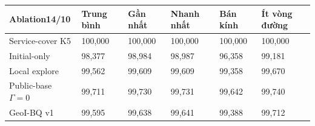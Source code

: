\par\smallskip\noindent\begin{tabularx}{\linewidth}{@{}P{4cm}XXXXX@{}}\toprule
\textbf{Ablation14/10} & \textbf{Trung bình} & \textbf{Gần nhất} & \textbf{Nhanh nhất} & \textbf{Bán kính} & \textbf{Ít vòng đường} \\
\midrule
Service-cover K5 & 100{,}000 & 100{,}000 & 100{,}000 & 100{,}000 & 100{,}000 \\
Initial-only & 98{,}377 & 98{,}984 & 98{,}987 & 96{,}358 & 99{,}181 \\
Local explore & 99{,}562 & 99{,}609 & 99{,}609 & 99{,}358 & 99{,}670 \\
Public-base $\Gamma=0$ & 99{,}711 & 99{,}730 & 99{,}731 & 99{,}642 & 99{,}740 \\
GeoI-BQ v1 & 99{,}595 & 99{,}638 & 99{,}641 & 99{,}388 & 99{,}712 \\
\bottomrule\end{tabularx}\par\smallskip
